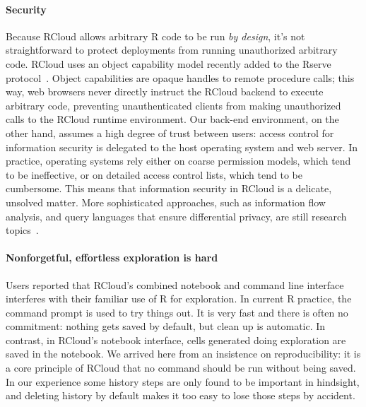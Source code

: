 \paragraph*{Security}
Because RCloud allows arbitrary R code to be run
\emph{by design}, it's not straightforward to protect deployments
from running unauthorized arbitrary code. RCloud uses an object capability model
\cite{Miller:2006:RCT} recently added to the Rserve
protocol~\cite{Urbanek:2003:AFW}. Object capabilities are opaque handles
to remote procedure calls; this way, web browsers never directly instruct the
RCloud backend to execute arbitrary code, preventing unauthenticated clients
from making unauthorized calls to the RCloud runtime environment.
%
Our back-end environment, on the other hand, assumes a high degree of trust between users:
access control for information security is delegated to the host
operating system and web server. In practice, operating
systems rely either on coarse permission models,
which tend to be ineffective, or on detailed access control
lists, which tend to be cumbersome. This means that information security
in RCloud is a delicate, unsolved matter. More
sophisticated approaches, such as information flow analysis,
and query languages that ensure differential privacy, are
still research topics~\cite{Moore:2011:SAF}.

\paragraph*{Nonforgetful, effortless exploration is hard}
Users reported that RCloud's combined notebook and command line
interface interferes with their familiar use of R for exploration.  In
current R practice, the command prompt is used to try things out.  It
is very fast and there is often no commitment: nothing gets saved by
default, but clean up is automatic.  In contrast, in RCloud's
notebook interface, cells generated doing exploration are saved in the
notebook.  We arrived here from an insistence on reproducibility: it is a
core principle of RCloud that no command should be run without being
saved. In our experience some history steps are only found to be
important in hindsight, and deleting history by default makes it too
easy to lose those steps by accident.

